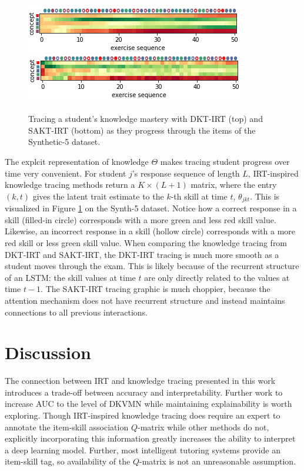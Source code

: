 \begin{figure}[h]
  \centering
  \includegraphics[width=.7\textwidth]{img/kt_irt/knowledge_trace_lstm_edited.png}\\
  \vspace{.5cm}
  \includegraphics[width=.7\textwidth]{img/kt_irt/knowledge_trace_attn_edited.png}
  \caption{Tracing a student's knowledge mastery with DKT-IRT (top) and SAKT-IRT (bottom) as they progress through the items of the Synthetic-5 dataset.}
  \label{fig:synth5_trace}
\end{figure}

The explcit representation of knowledge $\Theta$ makes tracing student progress over time very convenient. For student $j$'s response sequence of length $L$, IRT-inspired knowledge tracing methods return a $K \times (L+1)$ matrix, where the entry $(k,t)$ gives the latent trait estimate to the $k$-th skill at time $t$, $\theta_{jkt}$. This is visualized in Figure \ref{fig:synth5_trace} on the Synth-5 dataset. Notice how a correct response in a skill (filled-in circle) corresponds with a more green and less red skill value. Likewise, an incorrect response in a skill (hollow circle) corresponds with a more red skill or less green skill value. When comparing the knowledge tracing from DKT-IRT and SAKT-IRT, the DKT-IRT tracing is much more smooth as a student moves through the exam. This is likely because of the recurrent structure of an LSTM: the skill values at time $t$ are only directly related to the values at time $t-1$. The SAKT-IRT tracing graphic is much choppier, because the attention mechanism does not have recurrent structure and instead maintains connections to all previous interactions.


\section{Discussion}
The connection between IRT and knowledge tracing presented in this work introduces a trade-off between accuracy and interpretability. Further work to increase AUC to the level of DKVMN while maintaining explainability is worth exploring. Though IRT-inspired knowledge tracing does require an expert to annotate the item-skill association $Q$-matrix while other methods do not, explicitly incorporating this information greatly increases the ability to interpret a deep learning model. Further, most intelligent tutoring systems provide an item-skill tag, so availability of the $Q$-matrix is not an unreasonable assumption.

